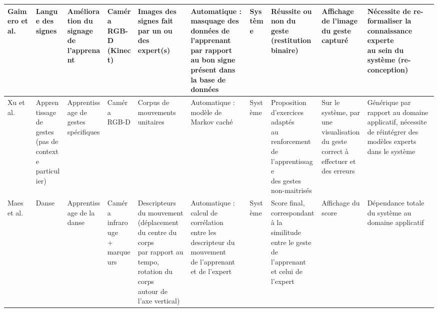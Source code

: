 \begin{landscape}
\begin{table}[]
{\begin{tabular}{|l|l|l|l|l|l|l|l|l|l|}
Gaimero et al. & Langue des signes & \makecell[l]{Amélioration du signage\\de l'apprenant} & \makecell[l]{Caméra RGB-D\\(Kinect)} & \makecell[l]{Images des signes fait par un ou\\des expert(s)} & \makecell[l]{Automatique : masquage des données de\\l'apprenant par rapport au bon signe\\présent dans la base de données} & Système & \makecell[l]{Réussite ou non du geste\\(restitution binaire)} & \makecell[l]{Affichage de l'image du geste\\capturé} & \makecell[l]{Nécessite de re-formaliser la connaissance experte\\au sein du système (re-conception)} \\ \hline

Xu et al. & \makecell[l]{Apprentissage\\de gestes\\(pas de contexte\\particulier)} & \makecell[l]{Apprentissage de\\gestes spécifiques} & Caméra RGB-D & Corpus de mouvements unitaires & Automatique : modèle de Markov caché & Système & \makecell[l]{Proposition d'exercices adaptés\\au renforcement de l'apprentissage\\des gestes non-maitrisés} & \makecell[l]{Sur le système, par une\\visualisation du geste correct à\\effectuer et des erreurs} & \makecell[l]{Générique par rapport au domaine applicatif, nécessite\\ de réintégrer des modèles experts dans le système} \\ \hline

Maes et al. & Danse & Apprentissage de la danse & \makecell[l]{Caméra infrarouge\\+ marqueurs} & \makecell[l]{Descripteurs du mouvement\\(déplacement du centre du corps\\par rapport au tempo, rotation du corps\\autour de l'axe vertical)} & \makecell[l]{Automatique : calcul de corrélation\\entre les descripteur du mouvement\\de l'apprenant et de l'expert} & Système & \makecell[l]{Score final, correspondant à la\\similitude entre le geste de l'apprenant\\et celui de l'expert} & Affichage du score & Dépendance totale du système au domaine applicatif \\ \hline


\end{tabular}}
\end{table}
\end{landscape}

